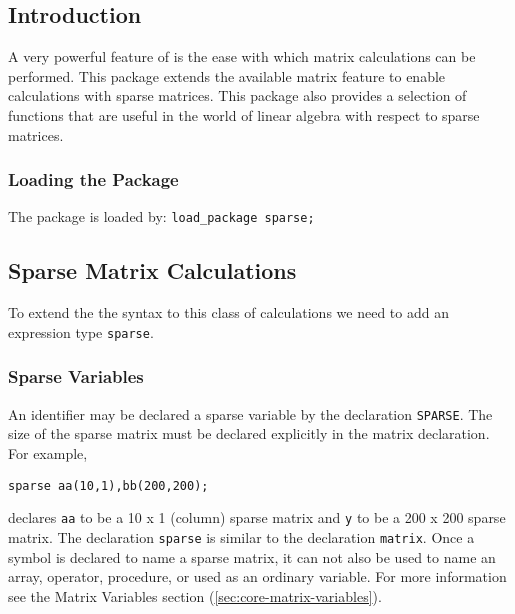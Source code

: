 

\newcommand\sparselineqlist {lin\_eqn$_{1}$,lin\_eqn$_{2}$, \ldots ,lin\_eqn$_{n}$}
\newcommand\sparsematlist   {mat$_{1}$,mat$_{2}$, \ldots ,mat$_{n}$}
\newcommand\sparseveclist   {vec$_{1}$,vec$_{2}$, \ldots ,vec$_{n}$}

\newcommand\sparselazyfootnote{\footnote{The \{\}'s can be omitted.}}


\subsection{Introduction}
A very powerful feature of \REDUCE{} is the ease with which matrix
calculations can be performed.
This package extends the available matrix feature to enable calculations
with sparse matrices. This package also provides a selection of
functions that are useful in the world of linear algebra with respect to
sparse matrices.

\subsubsection*{Loading the Package}
The package is loaded by: \texttt{load\_package sparse;}

\subsection{Sparse Matrix Calculations}
To extend the the syntax to this class of calculations we need to add an
expression type \texttt{sparse}.

\subsubsection{Sparse Variables}
\hypertarget{command:SPARSE}{}
An identifier may be declared a sparse variable by the declaration
\texttt{SPARSE}.
The size of the sparse matrix must be declared explicitly in the matrix
declaration. For example,
\begin{verbatim}
sparse aa(10,1),bb(200,200);
\end{verbatim}
declares \texttt{aa} to be a 10 x 1 (column) sparse matrix and \texttt{y} to
be a 200 x 200 sparse matrix.
The declaration \texttt{sparse} is similar to the declaration \texttt{matrix}.
Once a symbol is declared to name a sparse matrix, it can not also be
used to name an array, operator, procedure, or used as an ordinary
variable. For more information see the Matrix Variables
section (\ref{sec:core-matrix-variables}).

